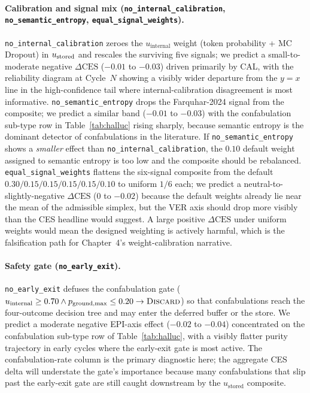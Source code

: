 \paragraph{Calibration and signal mix
(\texttt{no\_internal\_calibration}, \texttt{no\_semantic\_entropy},
\texttt{equal\_signal\_weights}).}
\texttt{no\_internal\_calibration} zeroes the $u_{\text{internal}}$
weight (token probability + MC Dropout) in $u_{\text{stored}}$ and rescales the
surviving five signals; we predict a small-to-moderate negative
$\Delta\text{CES}$ ($-0.01$ to $-0.03$) driven primarily by CAL, with
the reliability diagram at Cycle~$N$ showing a visibly wider departure
from the $y=x$ line in the high-confidence tail where internal-calibration
disagreement is most informative. \texttt{no\_semantic\_entropy} drops
the Farquhar-2024 signal from the composite; we predict a similar band
($-0.01$ to $-0.03$) with the confabulation sub-type row in
Table~\ref{tab:halluc} rising sharply, because semantic entropy is the
dominant detector of confabulations in the literature. If
\texttt{no\_semantic\_entropy} shows a \emph{smaller} effect than
\texttt{no\_internal\_calibration}, the $0.10$ default weight assigned
to semantic entropy is too low and the composite should be rebalanced.
\texttt{equal\_signal\_weights} flattens the six-signal composite from
the default $0.30/0.15/0.15/0.15/0.15/0.10$ to uniform $1/6$ each; we
predict a neutral-to-slightly-negative $\Delta\text{CES}$ ($0$ to
$-0.02$) because the default weights already lie near the mean of the
admissible simplex, but the VER axis should drop more visibly than the
CES headline would suggest. A large positive $\Delta\text{CES}$ under
uniform weights would mean the designed weighting is actively harmful,
which is the falsification path for Chapter~4's weight-calibration
narrative.

\paragraph{Safety gate (\texttt{no\_early\_exit}).}
\texttt{no\_early\_exit} defuses the confabulation gate
($u_{\text{internal}} \geq 0.70 \wedge p_{\text{ground,max}} \leq 0.20
\rightarrow \textsc{Discard}$) so that confabulations reach the
four-outcome decision tree and may enter the deferred buffer or the
store. We predict a moderate negative EPI-axis effect ($-0.02$ to
$-0.04$) concentrated on the confabulation sub-type row of
Table~\ref{tab:halluc}, with a visibly flatter purity trajectory in
early cycles where the early-exit gate is most active. The
confabulation-rate column is the primary diagnostic here; the
aggregate CES delta will understate the gate's importance because
many confabulations that slip past the early-exit gate are still
caught downstream by the $u_{\text{stored}}$ composite.

